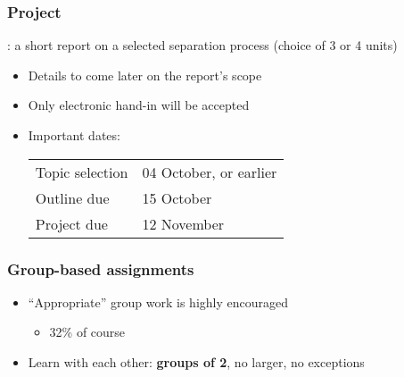 \begin{frame}\frametitle{Project}
	\begin{exampleblock}{}
		\textbf{{\color{myBlue}{AIM}}}: a short report on a selected separation process (choice of 3 or 4 units)
	\end{exampleblock}
	\begin{itemize}
		\item	Details to come later on the report's scope
		\item	Only electronic hand-in will be accepted
		\item	Important dates:

		\vspace{12pt}
		\begin{tabular}{ll}
			Topic selection & 04 October, or earlier\\
			Outline due & 15 October\\
			Project due & 12 November\\
		\end{tabular}
	\end{itemize}
\end{frame}

\begin{frame}\frametitle{Group-based assignments}
	\begin{itemize}
		\item	``Appropriate'' group work is highly encouraged
		\begin{itemize}
			\item	32\% of course
		\end{itemize}
		\item	Learn with each other: \textbf{groups of 2}, no larger, no exceptions
	\end{itemize}
\end{frame}

